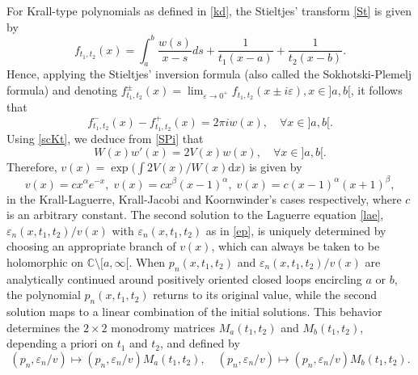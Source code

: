\documentclass[10pt, reqno]{amsart}
\numberwithin{equation}{section}
\numberwithin{equation}{section}
\begin{document}
For Krall-type polynomials as defined in \eqref{kd}, the Stieltjes' transform \eqref{St} is given by
\begin{equation}
f_{t_1,t_2}(x)=\int_{a}^{b}\frac{w(s)}{x-s}ds +\frac{1}{t_1(x-a)}+\frac{1}{t_2(x-b)}.\label{SKt}
\end{equation}
Hence, applying the Stieltjes' inversion formula (also called the Sokhotski-Plemelj formula) and denoting  $f^{\pm}_{t_1,t_2}(x)=\lim_{\varepsilon \to 0^+} f_{t_1,t_2}(x\pm i\varepsilon), x\in]a,b[$, it follows that
\begin{equation}
f^{-}_{t_1,t_2}(x)-f^{+}_{t_1,t_2}(x)=2\pi i w(x),\quad \forall x\in]a,b[. \label{SPi}
\end{equation}
Using \eqref{scKt}, we deduce from \eqref{SPi} that
\begin{equation*} 
W(x)w'(x)=2V(x)w(x),\quad \forall x\in ]a,b[.
\end{equation*}
Therefore, $v(x)=\exp\big(\int 2V(x)/W(x)\mbox{d}x\big)$ is given by
\begin{equation} \label{vex}
v(x)=cx^{\alpha} e^{-x},\; v(x)=cx^{\beta} (x-1)^{\alpha},\; v(x)=c(x-1)^{\alpha}(x+1)^{\beta},
\end{equation}
in the Krall-Laguerre, Krall-Jacobi and Koornwinder's cases respectively, where $c$ is an arbitrary constant. The second solution to the Laguerre equation \eqref{lae}, $\varepsilon_n(x,t_1,t_2)/v(x)$ with $\varepsilon_n(x,t_1,t_2)$ as in \eqref{ep}, is uniquely determined by choosing an appropriate branch of $v(x)$, which can always be taken to be holomorphic on $\mathbb{C}\setminus [a,\infty[$. When $p_n(x,t_1,t_2)$ and $\varepsilon_n(x,t_1,t_2)/v(x)$ are analytically continued around positively oriented closed loops encircling  $a$ or $b$, the polynomial $p_n(x,t_1,t_2)$ returns to its original value, while the second solution maps to a linear combination of the initial solutions. This behavior determines the $2\times2$ monodromy matrices $M_a(t_1,t_2)$ and $M_b(t_1,t_2)$, depending a priori on $t_1$ and $t_2$, and defined by
\begin{equation*}
(p_n,\varepsilon_n/v)\mapsto (p_n,\varepsilon_n/v)M_{a}(t_1,t_2),\quad (p_n,\varepsilon_n/v)\mapsto (p_n,\varepsilon_n/v)M_b(t_1,t_2).
\end{equation*}
\end{document}
